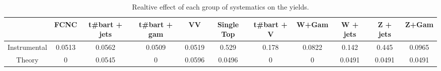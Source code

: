 \begin{table}[htbp]
\begin{center}
\begin{tabular}{|c|c|c|c|c|c|c|c|c|c|c|}
\hline 
      & FCNC      & t#bar{t} + jets      & t#bar{t} +  gam      & VV      & Single Top      & t#bar{t} + V      & W+Gam      & W + jets      & Z + jets      & Z+Gam \\ 
\hline 
 Instrumental & 0.0513 & 0.0562 & 0.0509 & 0.0519 & 0.529 & 0.178 & 0.0822 & 0.142 & 0.445 & 0.0965 \\ 
 Theory & 0 & 0.0545 & 0 & 0.0596 & 0.0496 & 0 & 0 & 0.0491 & 0.0491 & 0.0491 \\ 
\hline 
\end{tabular} 
\caption{Realtive effect of each group of systematics on the yields.} 
\end{center} 
\end{table} 
